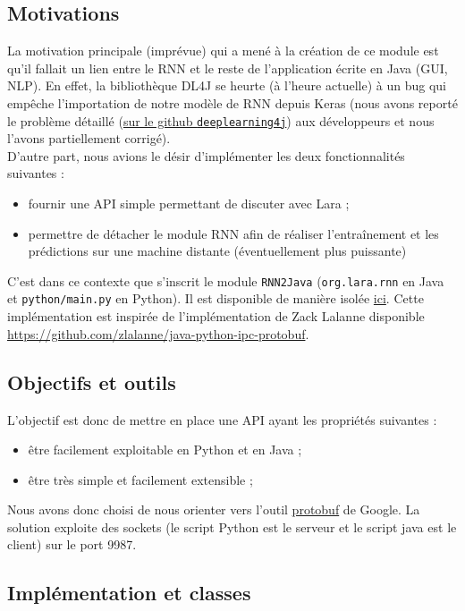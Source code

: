 \documentclass[10pt,a4paper]{article}
\newcommand\tab[1][0.5cm]{\hspace*{#1}}
\begin{document}
\subsection{Motivations}
La motivation principale (imprévue) qui a mené à la création de ce module est qu'il fallait un lien entre le RNN et le reste de l'application écrite en Java (GUI, NLP). En effet, la bibliothèque DL4J se heurte (à l'heure actuelle) à un bug qui empêche l'importation de notre modèle de RNN depuis Keras (nous avons reporté le problème détaillé (\href{https://github.com/eclipse/deeplearning4j/issues/8924}{sur le github \texttt{deeplearning4j}}) aux développeurs et nous l'avons partiellement corrigé). \\
\tab D'autre part, nous avions le désir d'implémenter les deux fonctionnalités suivantes :
\begin{itemize}
\item fournir une API simple permettant de discuter avec Lara ;
\item permettre de détacher le module RNN afin de réaliser l'entraînement et les prédictions sur une machine distante (éventuellement plus puissante)
\end{itemize}
C'est dans ce contexte que s'inscrit le module \texttt{RNN2Java} (\texttt{org.lara.rnn} en Java et \texttt{python/main.py} en Python). Il est disponible de manière isolée \href{https://github.com/LaraProject/rnn2java}{ici}. Cette implémentation est inspirée de l'implémentation de Zack Lalanne disponible \href{ici}{https://github.com/zlalanne/java-python-ipc-protobuf}.
\subsection{Objectifs et outils}
L'objectif est donc de mettre en place une API ayant les propriétés suivantes :
\begin{itemize}
\item être facilement exploitable en Python et en Java ;
\item être très simple et facilement extensible ;
\end{itemize}
Nous avons donc choisi de nous orienter vers l'outil \href{https://developers.google.com/protocol-buffers}{protobuf} de Google. La solution exploite des sockets (le script Python est le serveur et le script java est le client) sur le port 9987.
\subsection{Implémentation et classes}
\end{document}
